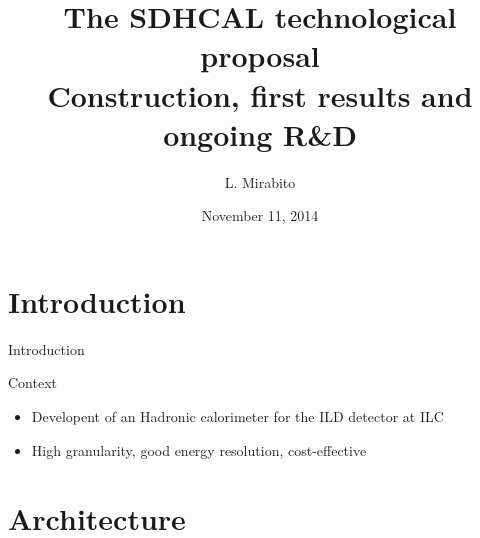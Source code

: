 \documentclass[10pt]{beamer}
\title[The SDHCAL technological proposal]{The SDHCAL technological proposal \\ Construction, first results and ongoing R\&D}
\author{L. Mirabito}
\institute{IPN Lyon, UCB Lyon, IN2P3, CNRS}
\date{November 11, 2014}
\begin{document}


\begin{frame}
\titlepage
\end{frame}

\section{Introduction}

\begin{frame}{Introduction}
\pause 
\begin{block}{ Context}
  \begin{itemize}
  \item Developent of an Hadronic calorimeter for the ILD detector at ILC
  \item High granularity, good energy resolution, cost-effective
  \end{itemize}
\end{block}

\end{frame}

\section{Architecture}
\end{document}
